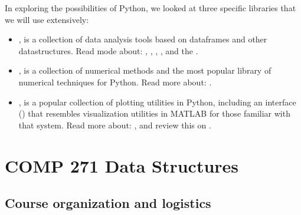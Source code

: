 \documentclass[letterpaper,10pt,english]{sphinxmanual}
\begin{document}
In exploring the possibilities of Python, we looked at three specific libraries that we will use extensively:
\begin{itemize}
\item {} 
, is a collection of data analysis tools based on dataframes and other datastructures. Read mode about:
,
,
,
, and the
.

\item {} 
, is a collection of numerical methods and the most popular library of numerical techniques for Python.
Read more about:
.

\item {} 
, is a popular collection of plotting utilities in Python, including an interface () that
resembles visualization utilities in MATLAB for those familiar with that system. Read more about:
,
and review this 
on .

\end{itemize}


\chapter{COMP 271 Data Structures}
\label{\detokenize{COMP271/introduction:comp-271-data-structures}}\label{\detokenize{COMP271/introduction::doc}}

\section{Course organization and logistics}
\label{\detokenize{COMP271/organization:course-organization-and-logistics}}\label{\detokenize{COMP271/organization::doc}}
\end{document}
